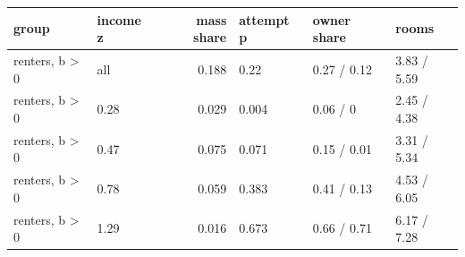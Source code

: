 \begingroup\small
\setlength{\tabcolsep}{3pt}
\renewcommand{\arraystretch}{1.04}
\begin{tabularx}{\linewidth}{XXrXXX}
\toprule
group & income z & mass share & attempt p & owner share & rooms \\
\midrule
renters, b \textgreater{} 0 & all & 0.188 & 0.22 & 0.27 / 0.12 & 3.83 / 5.59 \\
renters, b \textgreater{} 0 & 0.28 & 0.029 & 0.004 & 0.06 / 0 & 2.45 / 4.38 \\
renters, b \textgreater{} 0 & 0.47 & 0.075 & 0.071 & 0.15 / 0.01 & 3.31 / 5.34 \\
renters, b \textgreater{} 0 & 0.78 & 0.059 & 0.383 & 0.41 / 0.13 & 4.53 / 6.05 \\
renters, b \textgreater{} 0 & 1.29 & 0.016 & 0.673 & 0.66 / 0.71 & 6.17 / 7.28 \\
\bottomrule
\end{tabularx}
\endgroup
